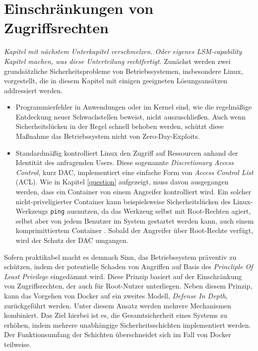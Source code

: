 \documentclass[../main.tex]{subfiles}
\begin{document}

  \section{Einschränkungen von Zugriffsrechten}
		\emph{Kapitel mit nächstem Unterkapitel verschmelzen. Oder eigenes LSM-capability Kapitel machen, was diese Unterteilung rechtfertigt.}
		Zunächst werden zwei grundsätzliche Sicherheitsprobleme von Betriebssystemen, insbesondere Linux, vorgestellt, die in diesem Kapitel mit einigen geeigneten Lösungsansätzen addressiert werden.

		\begin{itemize}
			\item	Programmierfehler in Anwendungen oder im Kernel sind, wie die regelmäßige Entdeckung neuer Schwachstellen beweist, nicht auszuschließen. Auch wenn Sicherheitslücken in der Regel schnell behoben werden, schützt diese Maßnahme das Betriebssystem nicht von Zero-Day-Exploits.
			\item	Standardmäßig kontrolliert Linux den Zugriff auf Ressourcen anhand der Identität des anfragenden Users. Diese sogenannte \emph{Discretionary Access Control}, kurz \acrshort{DAC}, implementiert eine einfache Form von \emph{Access Control List} (\acrshort{ACL}). Wie in Kapitel \ref{question} aufgezeigt, muss davon ausgegangen werden, dass ein Container von einem Angreifer kontrolliert wird. Ein solcher nicht-priveligierter Container kann beispielsweise Sicherheitslücken des Linux-Werkzeugs \texttt{ping} ausnutzen, da das Werkzeug selbst mit Root-Rechten agiert, selbst aber von jedem Benutzer im System gestartet werden kann, auch einem komprimittiertem Container \cite[S.26]{SELinuxApparmor}. Sobald der Angreifer über Root-Rechte verfügt, wird der Schutz der \acrshort{DAC} umgangen.
		\end{itemize}

		Sofern praktikabel macht es demnach Sinn, das Betriebssystem präventiv zu schützen, indem der potentielle Schaden von Angriffen auf Basis des \emph{Princliple Of Least Privilege} eingedämmt wird. Diese Prinzip basiert auf der Einschränkung von Zugriffsrechten, der auch für Root-Nutzer unterliegen. Neben diesem Prinzip, kann das Vorgehen von Docker auf ein zweites Modell, \emph{Defense In Depth}, zurückgeführt werden. Unter diesem Ansatz werden mehrere Mechanismen kombiniert. Das Ziel hierbei ist es, die Gesamtsicherheit eines Systems zu erhöhen, indem mehrere unabhängige Sicherheitsschichten implementiert werden. Der Funktionsumfang der Schichten überschneidet sich im Fall von Docker teilweise.
\end{document}
